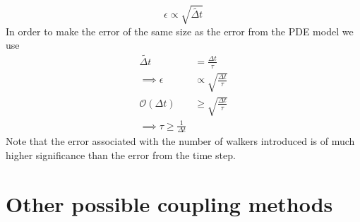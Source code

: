 \begin{equation}
 \epsilon \propto \sqrt{\tilde{\Delta t}}
\end{equation}
In order to make the error of the same size as the error from the PDE model we use 
\begin{align*}
 \tilde{\Delta t} &= \frac{\Delta t}{\tau} \\
 \implies \epsilon &\propto \sqrt{\frac{\Delta t}{\tau}} \\
 \mathcal{O}(\Delta t) &\geq \sqrt{\frac{\Delta t}{\tau}} \\
 \implies \tau \geq \frac{1}{\Delta t}
\end{align*}
\noindent Note that the error associated with the number of walkers introduced is of much higher significance than the error from the time step.

\section{Other possible coupling methods}\label{other_possible_coupling_methods}

